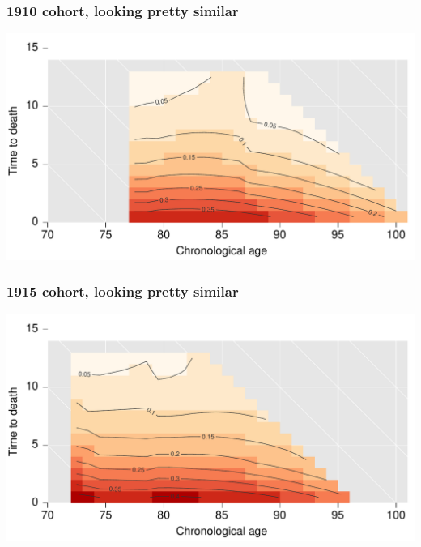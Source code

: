 \documentclass[20pt]{beamer}
\begin{document}

\begin{frame}
\frametitle{1910 cohort, looking pretty similar}
\vspace{-4em}
\begin{center}
\includegraphics[scale=1]{Figures/srhpoor1910.pdf}
\end{center}
\end{frame}


\begin{frame}
\frametitle{1915 cohort, looking pretty similar}
\vspace{-4em}
\begin{center}
\includegraphics[scale=1]{Figures/srhpoor1915.pdf}
\end{center}
\end{frame}

\end{document}
